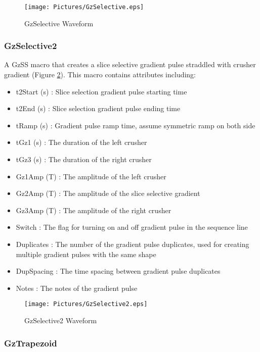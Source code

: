 \documentclass{book}%
\begin{document}
\begin{figure}[htbp]
	\centering
		\texttt{[image: Pictures/GzSelective.eps]}
	\caption{GzSelective Waveform}
	\label{fig:GzSelective}
\end{figure}		


\subsubsection{GzSelective2}

A GzSS macro that creates a slice selective gradient pulse straddled with crusher gradient (Figure \ref{fig:GzSelective2}). This macro contains attributes including:

\begin{itemize}
	\item t2Start (s) : Slice selection gradient pulse starting time
	\item t2End (s) : Slice selection gradient pulse ending time
	\item tRamp (s) : Gradient pulse ramp time, assume symmetric ramp on both side
	\item tGz1 (s) : The duration of the left crusher
	\item tGz3 (s) : The duration of the right crusher
	\item Gz1Amp (T) : The amplitude of the left crusher
	\item Gz2Amp (T) : The amplitude of the slice selective gradient
	\item Gz3Amp (T) : The amplitude of the right crusher
	\item Switch : The flag for turning on and off gradient pulse in the sequence line
	\item Duplicates : The number of the gradient pulse duplicates, used for creating multiple gradient pulses with the same shape
	\item DupSpacing : The time spacing between gradient pulse duplicates
	\item Notes : The notes of the gradient pulse 
\end{itemize}

\begin{figure}[htbp]
	\centering
		\texttt{[image: Pictures/GzSelective2.eps]}
	\caption{GzSelective2 Waveform}
	\label{fig:GzSelective2}
\end{figure}		


\subsubsection{GzTrapezoid}
\end{document}
